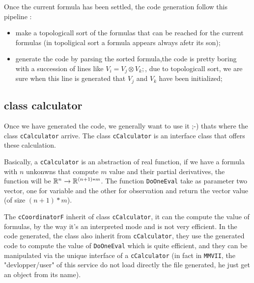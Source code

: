 Once the current formula has been settled, the code generation follow this pipeline :

\begin{itemize}
     \item make a topologicall sort of the formulas that can be reached for the current formulas
         (in topoligical sort a formula appears always afetr its son);

     \item generate the code by parsing the sorted formula,the code is pretty boring with 
           a succession of lines like $ V_i = V_j \otimes V_k; $, due to topologicall sort, we are
           sure when this line is generated that $V_j$ and $V_k$ have been initialized;
\end{itemize}



\subsection{class calculator}

Once we have generated the code, we generally want to use it ;-)  thats where 
the class {\tt cCalculator} arrive.  The class {\tt cCalculator} is an interface
class that offers these calculation.

Basically,  a {\tt cCalculator} is an abstraction of real function,
if we have a formula with $n$ unkonwns that compute $m$ value and their partial derivatives,
the function will be $\mathbb{R}^n \rightarrow \mathbb{R}^{(n+1)*m}$. 
The function {\tt DoOneEval} take as parameter two vector, one for variable and the other
for observation and return the vector value (of size $(n+1)*m$).

The {\tt cCoordinatorF} inherit of class {\tt cCalculator}, it can the compute the
value of formulas, by the way it's an interpreted mode and is not very efficient.
In the code generated, the class also inherit from {\tt cCalculator},  they
use the generated code to compute the value of {\tt DoOneEval} which is quite efficient,
and they can be manipulated via the unique interface of a {\tt cCalculator}
(in fact in {\tt MMVII}, the "devlopper/user" of this service do not load
directly the file generated, he just get an object from its name).




